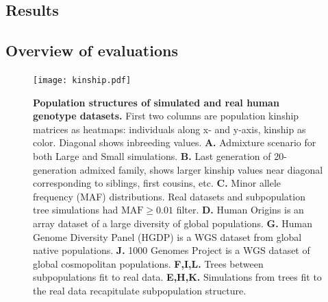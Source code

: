 \documentclass[11pt]{article}
\begin{document}
\begin{linenumbers}
\section{Results}

\subsection{Overview of evaluations}

\begin{figure}[hp]
  \centering
  \texttt{[image: kinship.pdf]}
  \caption{
    {\bf Population structures of simulated and real human genotype datasets.}
    First two columns are population kinship matrices as heatmaps: individuals along x- and y-axis, kinship as color.
    Diagonal shows inbreeding values.
    \textbf{A.}
    Admixture scenario for both Large and Small simulations.
    \textbf{B.}
    Last generation of 20-generation admixed family, shows larger kinship values near diagonal corresponding to siblings, first cousins, etc.
    \textbf{C.}
    Minor allele frequency (MAF) distributions.
    Real datasets and subpopulation tree simulations had $\text{MAF} \ge 0.01$ filter.
    \textbf{D.}
    Human Origins is an array dataset of a large diversity of global populations.
    \textbf{G.}
    Human Genome Diversity Panel (HGDP) is a WGS dataset from global native populations.
    \textbf{J.}
    1000 Genomes Project is a WGS dataset of global cosmopolitan populations.
    \textbf{F,I,L.}
    Trees between subpopulations fit to real data.
    \textbf{E,H,K.}
    Simulations from trees fit to the real data recapitulate subpopulation structure.
  }
  \label{fig:kinship}
\end{figure}


\end{linenumbers}
\end{document}
